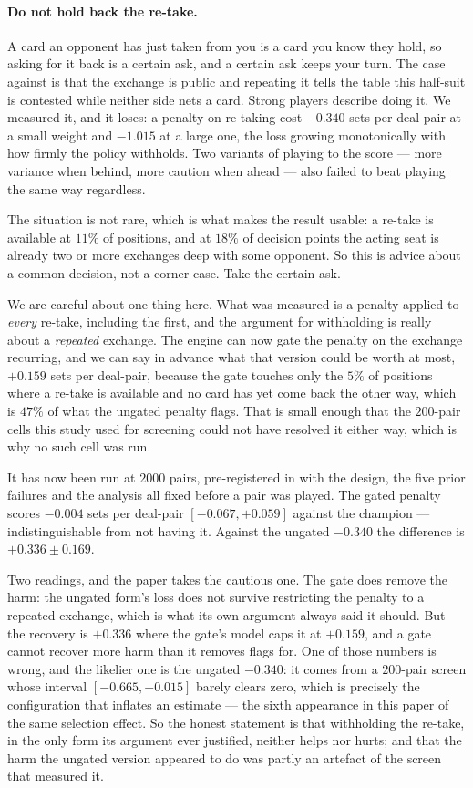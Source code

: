 \documentclass[11pt,letterpaper]{article}
\begin{document}
\paragraph{Do not hold back the re-take.} A card an opponent has just taken from
you is a card you know they hold, so asking for it back is a certain ask, and a
certain ask keeps your turn. The case against is that the exchange is public and
repeating it tells the table this half-suit is contested while neither side nets
a card. Strong players describe doing it. We measured it, and it loses: a penalty
on re-taking cost $-0.340$ sets per deal-pair at a small weight and $-1.015$ at a
large one, the loss growing monotonically with how firmly the policy withholds.
Two variants of playing to the score --- more variance when behind, more caution
when ahead --- also failed to beat playing the same way regardless.

The situation is not rare, which is what makes the result usable: a re-take is
available at $11\%$ of positions, and at $18\%$ of decision points the acting
seat is already two or more exchanges deep with some opponent. So this is advice
about a common decision, not a corner case. Take the certain ask.

We are careful about one thing here. What was measured is a penalty applied to
\emph{every} re-take, including the first, and the argument for withholding is
really about a \emph{repeated} exchange. The engine can now gate the penalty on
the exchange recurring, and we can say in advance what that version could be
worth at most, $+0.159$ sets per deal-pair, because the gate touches only
the $5\%$ of positions where a re-take is available and no card has yet come
back the other way, which is $47\%$ of what the ungated penalty flags.
That is small enough that the $200$-pair cells this study used for screening
could not have resolved it either way, which is why no such cell was run.

It has now been run at $2000$ pairs, pre-registered in
 with the design, the five prior
failures and the analysis all fixed before a pair was played. The gated penalty
scores $\mathbf{-0.004}$ sets per deal-pair $[-0.067, +0.059]$ against the
champion --- indistinguishable from not having it. Against the ungated
$-0.340$ the difference is $+0.336 \pm 0.169$.

Two readings, and the paper takes the cautious one. The gate does remove the
harm: the ungated form's loss does not survive restricting the penalty to a
repeated exchange, which is what its own argument always said it should. But
the recovery is $+0.336$ where the gate's model caps it at $+0.159$, and a gate
cannot recover more harm than it removes flags for. One of those numbers is
wrong, and the likelier one is the ungated $-0.340$: it comes from a $200$-pair
screen whose interval $[-0.665, -0.015]$ barely clears zero, which is precisely
the configuration that inflates an estimate --- the sixth appearance in this
paper of the same selection effect. So the honest statement is that withholding
the re-take, in the only form its argument ever justified, neither helps nor
hurts; and that the harm the ungated version appeared to do was partly an
artefact of the screen that measured it.
\end{document}
